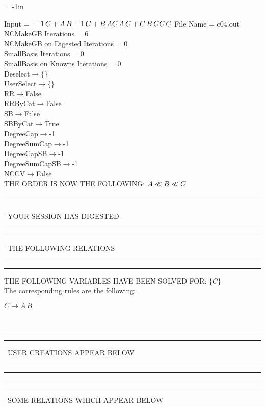 \voffset = -1in
\evensidemargin 0.1in
\oddsidemargin 0.1in
\textheight 9in
\textwidth 6in

\normalsize
\baselineskip=12pt
\noindent
Input = 
$
\\-1\,
 C + A\,
 B\\
-1\,
 C + B\,
 A\\
C\,
 A\,
 C + C\,
 B\,
 C\\
C\,
 C\\
$
File Name = c04.out\\
NCMakeGB Iterations = 6\\
NCMakeGB on Digested Iterations = 0\\
SmallBasis Iterations = 0\\
SmallBasis on Knowns Iterations = 0\\
Deselect$\rightarrow \{\}$\\
UserSelect$\rightarrow \{\}$\\
RR$\rightarrow $False\\
RRByCat$\rightarrow $False\\
SB$\rightarrow $False\\
SBByCat$\rightarrow $True\\
DegreeCap$\rightarrow $-1\\
DegreeSumCap$\rightarrow $-1\\
DegreeCapSB$\rightarrow $-1\\
DegreeSumCapSB$\rightarrow $-1\\
NCCV$\rightarrow $False\\
THE ORDER IS NOW THE FOLLOWING:\hfil\break
$
A\ll
B\ll
C\\
$
\rule[2pt]{6in}{4pt}\hfil\break
\rule[2pt]{1.879in}{4pt}
\ YOUR SESSION HAS DIGESTED\ 
\rule[2pt]{1.879in}{4pt}\hfil\break
\rule[2pt]{1.923in}{4pt}
\ THE FOLLOWING RELATIONS\ 
\rule[2pt]{1.923in}{4pt}\hfil\break
\rule[2pt]{6in}{4pt}\hfil\break
THE FOLLOWING VARIABLES HAVE BEEN SOLVED FOR:\hfil\break
$\{C\}$
\smallskip\\
The corresponding rules are the following:\smallskip\\
\begin{minipage}{6in}
$
C\rightarrow A\,
 B
$
\end{minipage}\medskip\\
\rule[2pt]{6in}{1pt}\hfil\break
\rule[2.5pt]{1.701in}{1pt}
\ USER CREATIONS APPEAR BELOW\ 
\rule[2.5pt]{1.701in}{1pt}\hfil\break
\rule[2pt]{6in}{1pt}\hfil\break
\rule[2pt]{6in}{4pt}\hfil\break
\rule[2pt]{1.45in}{4pt}
\ SOME RELATIONS WHICH APPEAR BELOW\ 
